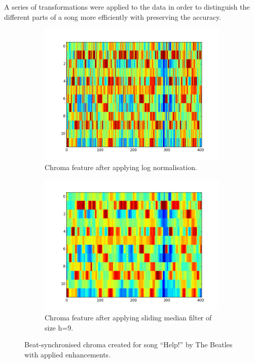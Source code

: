 A series of transformations were applied to the data in order to distinguish the different parts of a song more efficiently with preserving the accuracy.

\begin{figure}[b]
        \centering
        \begin{subfigure}[b]{0.47\textwidth}
                \includegraphics[width=\textwidth]{Figures/hpcp_synched_log_chroma}
                \caption{Chroma feature after applying log normalisation.}
                \label{fig:logchroma}
        \end{subfigure}%
        \begin{subfigure}[b]{0.47\textwidth}
                \includegraphics[width=\textwidth]{Figures/hpcp_synched_median_chroma}
                \caption{Chroma feature after applying sliding median filter of size h=9.}
                \label{fig:slidingchroma}
        \end{subfigure}
          \caption{Beat-synchronised chroma created for song ``Help!'' by The Beatles with applied enhancements.}
        \label{fig:chromaenhance}
\end{figure}


